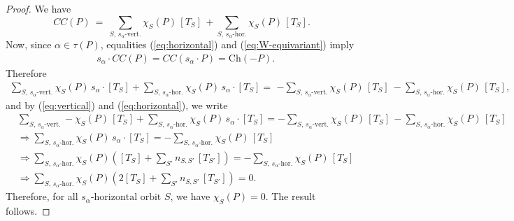 \documentclass[10pt,a4paper]{amsart}
\begin{document}
\begin{proof} 
We have
$$
CC(P)\ =\ \sum_{S,\, s_\alpha\mbox{-vert.}} \chi_{S}^{}(P)
  \, [T_{S}]\, +  \sum_{S,\, s_\alpha\mbox{-hor.}}
  \chi_{S}^{}(P)   \,   [T_{S}].
$$
Now, since $\alpha \in \tau (P)$, equalities (\ref{eq:horizontal}) and
(\ref{eq:W-equivariant}) imply   
  \begin{align*}
  &s_{\alpha}\cdot {CC}(P) = 
{CC}(s_\alpha\cdot P)  
  =\mathrm{Ch}(-P).
\end{align*}
Therefore
\begin{align*}
  \sum_{S,\, s_\alpha\mbox{-vert.}} \chi_{S}^{}(P)
  \,s_{\alpha} \cdot [T_{S}] +  \sum_{S,\, s_\alpha\mbox{-hor.}}
  \chi_{S}^{}(P)   \,s_{\alpha} \cdot   [T_{S}] =&
   -\sum_{S,\, s_\alpha\mbox{-vert.}} \chi_{S}^{}(P)
  \, [T_{S}]\ -\sum_{S,\, s_\alpha\mbox{-hor.}}
  \chi_{S}^{}(P)   \,   [T_{S}],
\end{align*}
and by (\ref{eq:vertical}) and (\ref{eq:horizontal}), we  write
\begin{align*}  
  &\sum_{S,\, s_\alpha\mbox{-vert.}} -\chi_{S}^{}(P)
  \,[T_{S}] +  \sum_{S,\, s_\alpha\mbox{-hor.}}
  \chi_{S}(P)   \,s_{\alpha} \cdot   [T_{S}] =
   -\sum_{S,\, s_\alpha\mbox{-vert.}} \chi_{S}^{}(P)
  \, [T_{S}] \, -
  \sum_{S,\, s_\alpha\mbox{-hor.}}
  \chi_{S}^{}(P)   \,   [T_{S}]\\
  &\Longrightarrow   \sum_{S,\, s_\alpha\mbox{-hor.}}
  \chi_{S}^{}(P)   \,s_{\alpha} \cdot   [T_{S}] =
   -  \sum_{S,\, s_\alpha\mbox{-hor.}}
   \chi_{S}^{}(P)   \,   [T_{S}]\\
   &\Longrightarrow  \sum_{S,\, s_\alpha\mbox{-hor.}}
  \chi_{S}^{}(P)   \left([T_{S}] + \sum_{S'}
  n_{S,S'} \,  [T_{S'}]\right)=
   -  \sum_{S,\, s_\alpha\mbox{-hor.}}
   \chi_{S}^{}(P)   \,   [T_{S}]\\
   &\Longrightarrow  \sum_{S,\, s_\alpha\mbox{-hor.}}
  \chi_{S}^{}(P)   \left(2[T_{S}] + \sum_{S'}
  n_{S,S'} \,  [T_{S'}]\right) = 0.
\end{align*}  
Therefore, for all $s_\alpha\mbox{-horizontal orbit }S$, we have
$\chi_{S}^{}(P)=0.$ 
The result follows.  
\end{proof}
\end{document}
